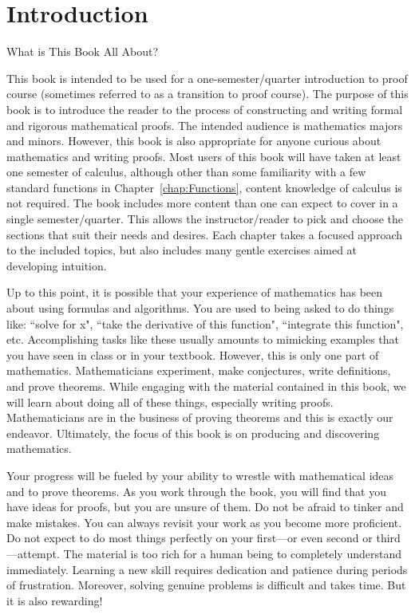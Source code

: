 \chapter{Introduction}\label{chap:intro}


\begin{section}{What is This Book All About?}%

This book is intended to be used for a one-semester/quarter introduction to proof course (sometimes referred to as a transition to proof course). The purpose of this book is to introduce the reader to the process of constructing and writing formal and rigorous mathematical proofs. The intended audience is mathematics majors and minors. However, this book is also appropriate for anyone curious about mathematics and writing proofs. Most users of this book will have taken at least one semester of calculus, although other than some familiarity with a few standard functions in Chapter~\ref{chap:Functions}, content knowledge of calculus is not required. The book includes more content than one can expect to cover in a single semester/quarter. This allows the instructor/reader to pick and choose the sections that suit their needs and desires. Each chapter takes a focused approach to the included topics, but also includes many gentle exercises aimed at developing intuition.

Up to this point, it is possible that your experience of mathematics has been about using formulas and algorithms. You are used to being asked to do things like: ``solve for x", ``take the derivative of this function", ``integrate this function", etc. Accomplishing tasks like these usually amounts to mimicking examples that you have seen in class or in your textbook. However, this is only one part of mathematics.  Mathematicians experiment, make conjectures, write definitions, and prove theorems.  While engaging with the material contained in this book, we will learn about doing all of these things, especially writing proofs. Mathematicians are in the business of proving theorems and this is exactly our endeavor. Ultimately, the focus of this book is on producing and discovering mathematics.

Your progress will be fueled by your ability to wrestle with mathematical ideas and to prove theorems.  As you work through the book, you will find that you have ideas for proofs, but you are unsure of them.  Do not be afraid to tinker and make mistakes.  You can always revisit your work as you become more proficient. Do not expect to do most things perfectly on your first---or even second or third---attempt. The material is too rich for a human being to completely understand immediately. Learning a new skill requires dedication and patience during periods of frustration. Moreover, solving genuine problems is difficult and takes time. But it is also rewarding!


\end{section}

